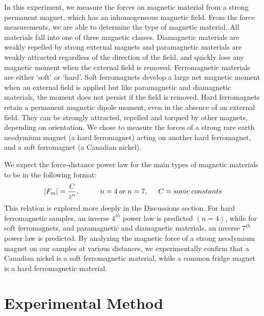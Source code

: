\documentclass[letterpaper]{article}
\begin{document}
In this experiment, we measure the forces on magnetic material from a strong permanent magnet,
which has an inhomogeneous magnetic field. From the force measurements, we are able to determine the type
of magnetic material. All materials fall into one of three magnetic classes.
Diamagnetic materials are weakly repelled by strong external magnets and paramagnetic materials are weakly attracted
regardless of the direction of the field, and quickly lose any magnetic moment when the external field is removed. Ferromagnetic materials are either `soft' or `hard'. Soft ferromagnets develop
a large net magnetic moment when an external field is applied but like paramagnetic and diamagnetic materials, the moment does not persist if the field is removed.
Hard ferromagnets retain a permanent magnetic dipole moment, even in the absence of an external field. They can be
strongly attracted, repelled and torqued by other magnets, depending on orientation.
We chose to measure the forces of a strong rare earth neodymium magnet (a hard ferromagnet) acting on
another hard ferromagnet, and a soft ferromagnet (a Canadian nickel).

We expect the force-distance power law for the main types of magnetic materials to be in the following format:
$$|F_m|=\frac{C}{z^n}, \hspace{1cm}n=4 \:or\: n=7,\hspace{0.5cm} C=some\:constants$$
This relation is explored more deeply in the Discussions section.
For hard ferromagnetic samples, an inverse $4^{th}$ power law is predicted $(n=4)$, while for soft ferromagnets, and paramagnetic and diamagnetic materials,
an inverse $7^{th}$ power law is predicted. By analyzing the magnetic force of a strong neodymium magnet on our
samples at various distances, we experimentally confirm that a Canadian nickel is a soft ferromagnetic material, while
a common fridge magnet is a hard ferromagnetic material.

\section{Experimental Method}
\end{document}

